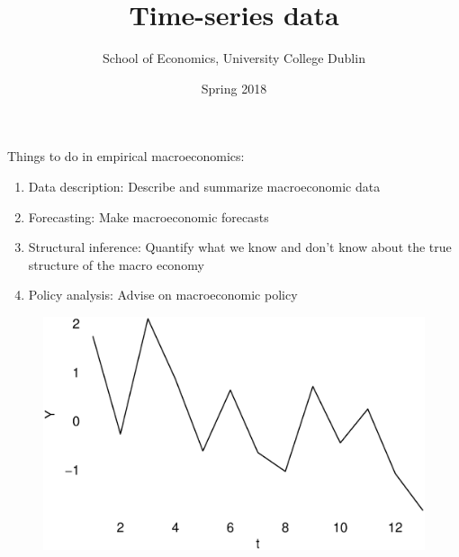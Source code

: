 \documentclass{beamer}
\title{Time-series data}
\author{School of Economics, University College Dublin}
\date{Spring 2018}
\begin{document}
\begin{frame}
 \titlepage
\end{frame}

\begin{frame}
 Things to do in empirical macroeconomics:
  \begin{enumerate}
  \item Data description: Describe and summarize macroeconomic data 
  \item Forecasting: Make macroeconomic forecasts 
  \item Structural inference: Quantify what we know and don't know about the true structure of the macro economy 
  \item Policy analysis: Advise on macroeconomic policy 
  \end{enumerate}
\end{frame}

\begin{frame}
  \begin{figure}
    \includegraphics[scale=.4]{ts_example.eps}
  \end{figure}
\end{frame}
\end{document}
